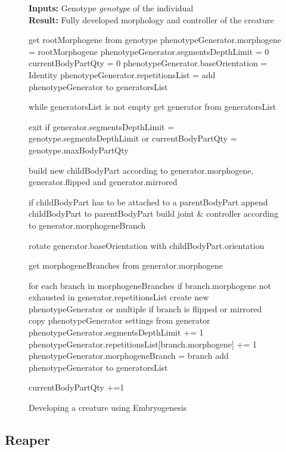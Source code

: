 \documentclass[main]{subfiles}
\begin{document}
\begin{figure}[H]
\scriptsize
\textbf{Inputs:} Genotype \textit{genotype} of the individual\\
\textbf{Result:} Fully developed morphology and controller of the creature
\begin{PseudoCode}[otherkeywords={create,add,exit,build,append,place,get,each},emph={rootMorphogene,genome,generatorsList, phenotypeGenerator,segmentsDepthLimit,currentBodyPartQty,childBodyPart,generator,morphogeneBranch,phenotypeGenerators,genotype,parentBodyPart,morphogene,.,maxBodyPartQty,morphogeneBranches,branch,joint,controller,orientation,baseOrientation,repetitionsList},emphstyle={\bfseries\textit}]
get rootMorphogene from genotype
phenotypeGenerator.morphogene = rootMorphogene
phenotypeGenerator.segmentsDepthLimit = 0
currentBodyPartQty = 0
phenotypeGenerator.baseOrientation = Identity
phenotypeGenerator.repetitionsList = {}
add phenotypeGenerator to generatorsList

while generatorsList is not empty
	get generator from generatorsList
	
	exit if generator.segmentsDepthLimit = genotype.segmentsDepthLimit or currentBodyPartQty = genotype.maxBodyPartQty
	
	build new childBodyPart according to generator.morphogene, generator.flipped and generator.mirrored
	
	if childBodyPart has to be attached to a parentBodyPart
		append childBodyPart to parentBodyPart
		build joint & controller according to generator.morphogeneBranch

	rotate generator.baseOrientation with childBodyPart.orientation
	
	get morphogeneBranches from generator.morphogene
	
	for each branch in morphogeneBranches
		if branch.morphogene not exhausted in generator.repetitionsList
			create new phenotypeGenerator or multiple if branch is flipped or mirrored
			copy phenotypeGenerator settings from generator
			phenotypeGenerator.segmentsDepthLimit += 1
			phenotypeGenerator.repetitionsList[branch.morphogene] += 1
			phenotypeGenerator.morphogeneBranch = branch
			add phenotypeGenerator to generatorsList
		
	currentBodyPartQty +=1
\end{PseudoCode}
\caption{Developing a creature using Embryogenesis}
\label{code:embryogenesis}
\end{figure}

\subsection{Reaper}
\label{subsection:Reaper}
\end{document}
